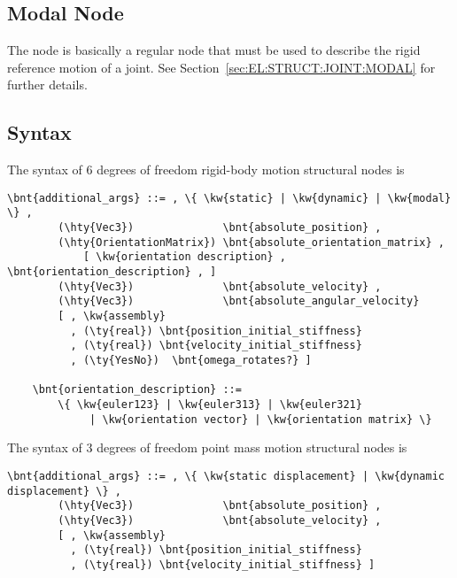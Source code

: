\subsection{Modal Node}
\label{sec:NODE:STRUCTURAL:MODAL}
The  node is basically a regular  node
that must be used to describe the rigid reference motion
of a  joint.
See Section~\ref{sec:EL:STRUCT:JOINT:MODAL} for further details.

\subsection{Syntax}
\label{sec:NODE:STRUCTURAL:SYNTAX}
The syntax of 6 degrees of freedom rigid-body motion structural nodes is
\begin{Verbatim}[commandchars=\\\{\}]
    \bnt{additional_args} ::= , \{ \kw{static} | \kw{dynamic} | \kw{modal} \} ,
        (\hty{Vec3})              \bnt{absolute_position} ,
        (\hty{OrientationMatrix}) \bnt{absolute_orientation_matrix} ,
            [ \kw{orientation description} , \bnt{orientation_description} , ]
        (\hty{Vec3})              \bnt{absolute_velocity} ,
        (\hty{Vec3})              \bnt{absolute_angular_velocity}
        [ , \kw{assembly}
          , (\ty{real}) \bnt{position_initial_stiffness}
          , (\ty{real}) \bnt{velocity_initial_stiffness}
          , (\ty{YesNo})  \bnt{omega_rotates?} ]

    \bnt{orientation_description} ::=
        \{ \kw{euler123} | \kw{euler313} | \kw{euler321}
             | \kw{orientation vector} | \kw{orientation matrix} \}
\end{Verbatim}

The syntax of 3 degrees of freedom point mass motion structural nodes is
\begin{Verbatim}[commandchars=\\\{\}]
    \bnt{additional_args} ::= , \{ \kw{static displacement} | \kw{dynamic displacement} \} ,
        (\hty{Vec3})              \bnt{absolute_position} ,
        (\hty{Vec3})              \bnt{absolute_velocity} ,
        [ , \kw{assembly}
          , (\ty{real}) \bnt{position_initial_stiffness}
          , (\ty{real}) \bnt{velocity_initial_stiffness} ]
\end{Verbatim}

